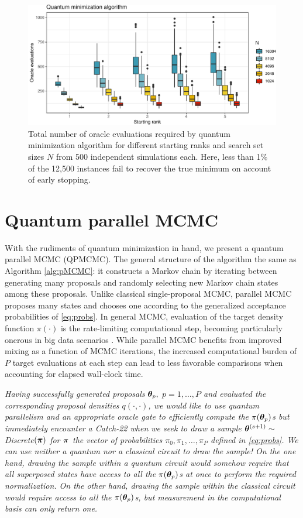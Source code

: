 \documentclass[12pt]{article} %
\begin{document}
 \begin{figure}[!t]
	\centering
	\includegraphics[width=0.7\linewidth]{qMinAlg.pdf}
	\caption{Total number of oracle evaluations required by quantum minimization algorithm \citep{durr1996quantum} for different starting ranks and search set sizes $N$ from 500 independent simulations each.  Here, less than 1\% of the 12,500 instances fail to recover the true minimum on account of early stopping.}\label{fig:qMinAlg}
\end{figure}

\section{Quantum parallel MCMC}\label{sec:qpmcmc}

With the rudiments of quantum minimization in hand, we present a quantum parallel MCMC (QPMCMC). The general structure of the algorithm the same as Algorithm \ref{alg:pMCMC}: it constructs a Markov chain by iterating between generating many proposals and randomly selecting new Markov chain states among these proposals.  Unlike classical single-proposal MCMC, parallel MCMC proposes many states and chooses one according to the generalized acceptance probabilities of \eqref{eq:probs}.
 In general MCMC, evaluation of the target density function $\pi(\cdot)$ is the rate-limiting computational step, becoming particularly onerous in big data scenarios \citep{massive}.  While parallel MCMC benefits from improved mixing as a function of MCMC iterations, the increased computational burden of $P$ target evaluations at each step can lead to less favorable comparisons when accounting for elapsed wall-clock time.
 
 \emph{Having successfully generated proposals $\boldsymbol{\theta}_p,$ $p=1,\dots,P$ and evaluated the corresponding proposal densities $q(\cdot,\cdot)$, we would like to use quantum parallelism and an appropriate oracle gate to efficiently compute the $\pi(\boldsymbol{\theta}_p)$s but immediately encounter a Catch-22 when we seek to draw a sample $\boldsymbol{\theta}^{(s+1)} \sim$ \emph{Discrete}$(\boldsymbol{\pi})$ for $\boldsymbol{\pi}$ the vector of probabilities $\pi_0,\pi_1,\dots,\pi_P$ defined in \eqref{eq:probs}.  We can use neither a quantum nor a classical circuit to draw the sample! On the one hand, drawing the sample within a quantum circuit would somehow require that all superposed states have access to all the $\pi(\boldsymbol{\theta}_p)$s at once to perform the required normalization.  On the other hand, drawing the sample within the classical circuit would require access to all the $\pi(\boldsymbol{\theta}_p)$s, but measurement in the computational basis can only return one.}  
 
\end{document}

